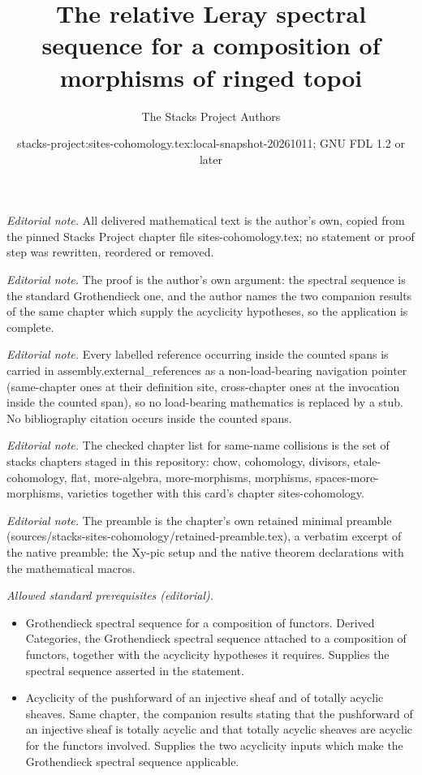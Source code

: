 \documentclass[10pt,a4paper]{amsart}
\title{The relative Leray spectral sequence for a composition of morphisms of ringed topoi}
\author{The Stacks Project Authors}
\date{stacks-project:sites-cohomology.tex:local-snapshot-20261011; GNU FDL 1.2 or later}
\theoremstyle{plain}
\theoremstyle{definition}
\theoremstyle{remark}
\numberwithin{equation}{subsection}
\begin{document}
\maketitle
\noindent\textit{Editorial note.} All delivered mathematical text is the author's own, copied from the pinned Stacks Project chapter file sites-cohomology.tex; no statement or proof step was rewritten, reordered or removed.\par\medskip
\noindent\textit{Editorial note.} The proof is the author's own argument: the spectral sequence is the standard Grothendieck one, and the author names the two companion results of the same chapter which supply the acyclicity hypotheses, so the application is complete.\par\medskip
\noindent\textit{Editorial note.} Every labelled reference occurring inside the counted spans is carried in assembly.external\_references as a non-load-bearing navigation pointer (same-chapter ones at their definition site, cross-chapter ones at the invocation inside the counted span), so no load-bearing mathematics is replaced by a stub. No bibliography citation occurs inside the counted spans.\par\medskip
\noindent\textit{Editorial note.} The checked chapter list for same-name collisions is the set of stacks chapters staged in this repository: chow, cohomology, divisors, etale-cohomology, flat, more-algebra, more-morphisms, morphisms, spaces-more-morphisms, varieties together with this card's chapter sites-cohomology.\par\medskip
\noindent\textit{Editorial note.} The preamble is the chapter's own retained minimal preamble (sources/stacks-sites-cohomology/retained-preamble.tex), a verbatim excerpt of the native preamble: the Xy-pic setup and the native theorem declarations with the mathematical macros.\par\medskip
\noindent\textit{Allowed standard prerequisites (editorial).}\begin{itemize}
\item Grothendieck spectral sequence for a composition of functors. Derived Categories, the Grothendieck spectral sequence attached to a composition of functors, together with the acyclicity hypotheses it requires. Supplies the spectral sequence asserted in the statement.
\item Acyclicity of the pushforward of an injective sheaf and of totally acyclic sheaves. Same chapter, the companion results stating that the pushforward of an injective sheaf is totally acyclic and that totally acyclic sheaves are acyclic for the functors involved. Supplies the two acyclicity inputs which make the Grothendieck spectral sequence applicable.
\end{itemize}\medskip
\end{document}
